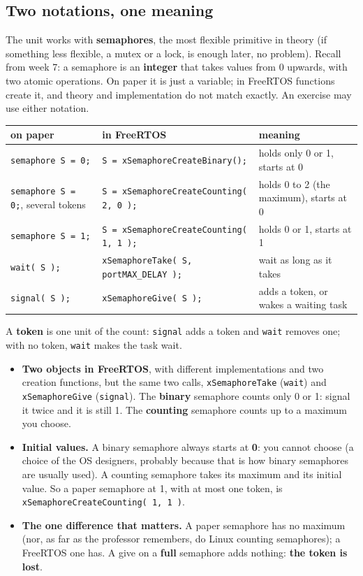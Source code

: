\subsection{Two notations, one meaning}
The unit works with \textbf{semaphores}, the most flexible primitive in theory (if something less flexible, a mutex or a lock, is enough later, no problem). Recall from week 7: a semaphore is an \textbf{integer} that takes values from 0 upwards, with two atomic operations. On paper it is just a variable; in FreeRTOS functions create it, and theory and implementation do not match exactly. An exercise may use either notation.
\begin{center}
\footnotesize
\begin{tabular}{P{0.22} P{0.42} P{0.27}}
    \hline
    \textbf{on paper} & \textbf{in FreeRTOS} & \textbf{meaning} \\
    \hline
    \texttt{semaphore S = 0;} & \texttt{S = xSemaphoreCreateBinary();} & holds only 0 or 1, starts at 0 \\
    \texttt{semaphore S = 0;}, several tokens & \texttt{S = xSemaphoreCreateCounting( 2, 0 );} & holds 0 to 2 (the maximum), starts at 0 \\
    \texttt{semaphore S = 1;} & \texttt{S = xSemaphoreCreateCounting( 1, 1 );} & holds 0 or 1, starts at 1 \\
    \texttt{wait( S );} & \texttt{xSemaphoreTake( S, portMAX\_DELAY );} & wait as long as it takes \\
    \texttt{signal( S );} & \texttt{xSemaphoreGive( S );} & adds a token, or wakes a waiting task \\
    \hline
\end{tabular}
\end{center}
A \textbf{token} is one unit of the count: \texttt{signal} adds a token and \texttt{wait} removes one; with no token, \texttt{wait} makes the task wait.
\begin{itemize}
    \item \textbf{Two objects in FreeRTOS}, with different implementations and two creation functions, but the same two calls, \texttt{xSemaphoreTake} (\texttt{wait}) and \texttt{xSemaphoreGive} (\texttt{signal}). The \textbf{binary} semaphore counts only 0 or 1: signal it twice and it is still 1. The \textbf{counting} semaphore counts up to a maximum you choose.
    \item \textbf{Initial values.} A binary semaphore always starts at \textbf{0}: you cannot choose (a choice of the OS designers, probably because that is how binary semaphores are usually used). A counting semaphore takes its maximum and its initial value. So a paper semaphore at 1, with at most one token, is \texttt{xSemaphoreCreateCounting( 1, 1 )}.
    \item \textbf{The one difference that matters.} A paper semaphore has no maximum (nor, as far as the professor remembers, do Linux counting semaphores); a FreeRTOS one has. A give on a \textbf{full} semaphore adds nothing: \textbf{the token is lost}.
\end{itemize}
